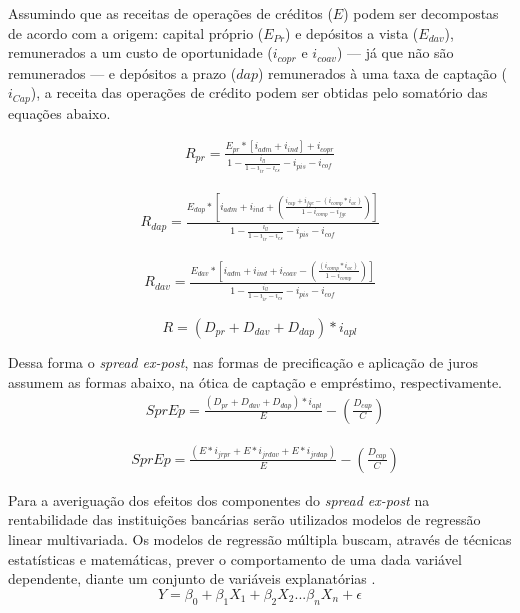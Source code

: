 \documentclass[12pt,12pt,openright,oneside,a4paper,chapter=TITLE,section=TITLE,subsection=TITLE,subsubsection=TITLE,english,french,spanish,portugues,sumario=tradicional]{abntex2}
\begin{document}
Assumindo que as receitas de operações de créditos (\(E\)) podem ser decompostas de acordo com a origem: capital próprio (\(E_{Pr}\)) e depósitos a vista (\(E_{dav}\)), remunerados a um custo de oportunidade (\(i_{copr}\) e \(i_{coav}\)) --- já que não são remunerados --- e depósitos a prazo (\(dap\)) remunerados à uma taxa de captação (\(i_{Cap}\)), a receita das operações de crédito podem ser obtidas pelo somatório das equações abaixo.

\[\begin{aligned}
R_{pr} = \frac{E_{pr} * [i_{adm} + i_{ind}] + i_{copr}}
{1 -  \frac{i_{ll}}{1 - i_{ir} - i_{cs}} - i_{pis} - i_{cof}}
\end{aligned}\]

\[\begin{aligned}
R_{dap} = \frac{E_{dap} * [i_{adm} + i_{ind} + (\frac{i_{cap}+ i_{fgc} - (i_{comp}*i_{ac})}{1 - i_{comp} - i_{fgc}})]}  {1 -  \frac{i_{ll}}{1 - i_{ir} - i_{cs}} - i_{pis} - i_{cof}}
\end{aligned}\]

\[\begin{aligned}
R_{dav} = \frac{E_{dav} * [i_{adm} + i_{ind} + i_{coav} - (\frac{(i_{comp}*i_{ac})}{1 - i_{comp}})]}{1 -  \frac{i_{ll}}{1 - i_{ir} - i_{cs}} - i_{pis} - i_{cof}}
\end{aligned}\]

\[
R = (D_{pr} + D_{dav} + D_{dap}) * i_{apl}
\]

Dessa forma o \emph{spread ex-post}, nas formas de precificação e aplicação de juros assumem as formas abaixo, na ótica de captação e empréstimo, respectivamente.
\[\begin{aligned}
& SprEp = \frac{(D_{pr} + D_{dav} + D_{dap})* i_{apl}}{E} - (\frac{D_{cap}}{C})
\end{aligned}\]

\[\begin{aligned}
& SprEp = \frac{(E*i_{jrpr} + E*i_{jrdav} + E*i_{jrdap})}{E} - (\frac{D_{cap}}{C})
\end{aligned}\]

Para a averiguação dos efeitos dos componentes do \emph{spread ex-post} na rentabilidade das instituições bancárias serão utilizados modelos de regressão linear multivariada. Os modelos de regressão múltipla buscam, através de técnicas estatísticas e matemáticas, prever o comportamento de uma dada variável dependente, diante um conjunto de variáveis explanatórias \cite{hill:2010} \cite{gareth:2017}.
\[
Y = \beta_0 + \beta_1X_1 + \beta_2X_2...\beta_nX_n + \epsilon
\]
\end{document}
